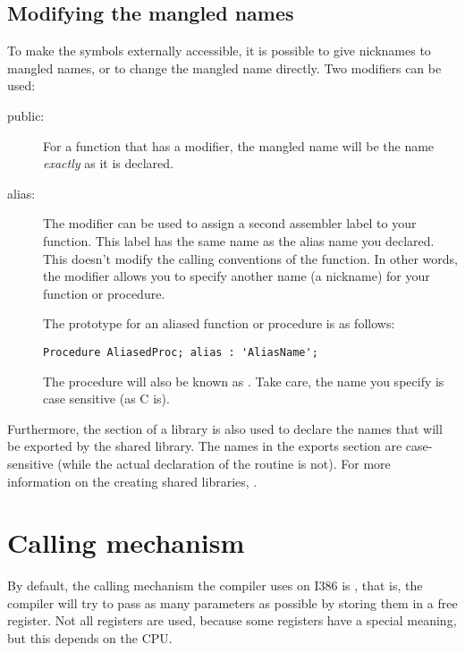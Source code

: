 \subsection{Modifying the mangled names}

To make the symbols externally accessible, it is possible to
give nicknames to mangled names, or to change the mangled
name directly. Two modifiers can be used:

\begin{description}
\item [public: ] For a function that has a  modifier, 
the mangled name will be the name {\em exactly} as it is declared.

\item [alias: ] The  modifier can be used to assign a second
assembler label to your function. This label has the same name as the
alias name you declared. This doesn't modify the calling conventions
of the function. In other words, the  modifier allows you to specify
another name (a nickname) for your function or procedure.

The prototype for an aliased function or procedure is as follows:
\begin{verbatim}
Procedure AliasedProc; alias : 'AliasName';
\end{verbatim}
The procedure  will also be known as . Take
care, the name you specify is case sensitive (as C is).

\end{description}

Furthermore, the  section of a library is also used to
declare the names that will be exported by the shared library. The
names in the exports section are case-sensitive (while the actual
declaration of the routine is not). For more information on the
creating shared libraries, .

\section{Calling mechanism}
\label{se:CallingConventions}

By default, the calling mechanism the compiler uses on I386 is , 
that is, the compiler will try to pass as many parameters as possible by 
storing them in a free register. Not all registers are used, because
some registers have a special meaning, but this depends on the CPU.

